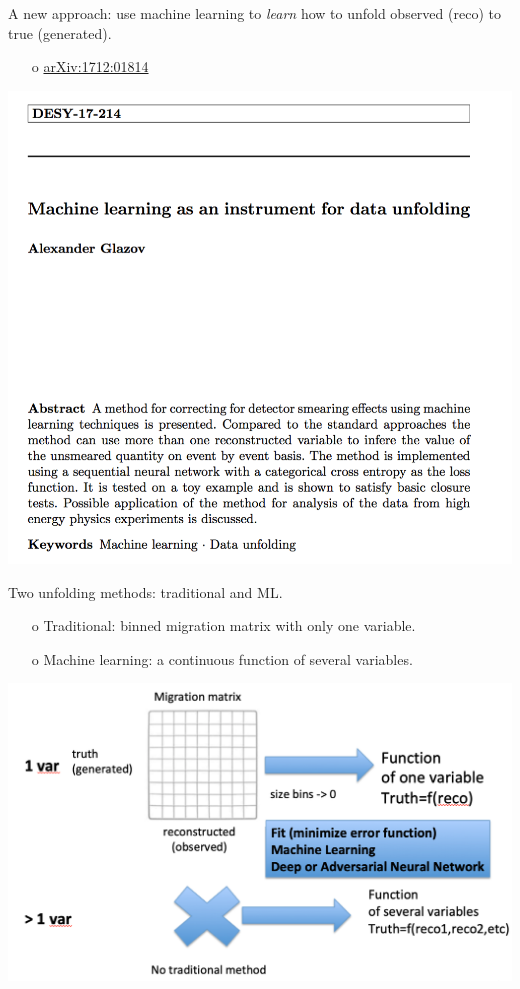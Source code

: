 \begin{frame}{A new approach: use machine learning to \emph{learn} how to unfold observed (reco) to true (generated).}
\begin{enumerate}
\item[o] \href{https://arxiv.org/pdf/1712.01814.pdf}{arXiv:1712:01814}
\end{enumerate}
\centering
\includegraphics[height=0.7\textheight]{./plots/PaperToyData.png}
\end{frame}
\clearpage

\begin{frame}{Two unfolding methods: traditional and ML.}
\begin{enumerate}
\item[o] Traditional: binned migration matrix with only one variable.
\item[o] Machine learning: a continuous function of several variables.
\end{enumerate}
\centering
\includegraphics[height=0.70\textheight]{./plots/Unfolding_Traditional_ML.png}
\end{frame}
\clearpage



